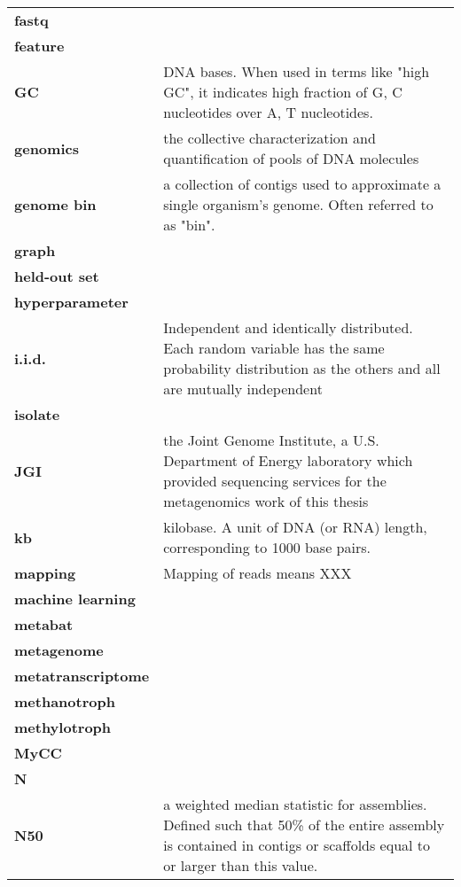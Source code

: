 \begin{singlespace}
\begin{longtable}{ p{}  p{} }
\textbf{fastq} &  \\
\textbf{feature} &  \\
\textbf{GC} & DNA bases.  When used in terms like "high GC", it indicates high fraction of G, C nucleotides over A, T nucleotides. \\
\textbf{genomics} & the collective characterization and quantification of pools of DNA molecules \\
\textbf{genome bin} & a collection of contigs used to approximate a single organism's genome.  Often referred to as "bin". \\
\textbf{graph} &  \\
\textbf{held-out set} &  \\
\textbf{hyperparameter} &  \\
\textbf{i.i.d.} & Independent and identically distributed.
    Each random variable has the same probability distribution as the others and all are mutually independent \\
\textbf{isolate} & \\
\textbf{JGI} & the Joint Genome Institute, a U.S. Department of Energy laboratory which provided sequencing
                services for the metagenomics work of this thesis \\
\textbf{kb} & kilobase. A unit of DNA (or RNA) length, corresponding to 1000 base pairs. \\
\textbf{mapping} & Mapping of reads means XXX \\
\textbf{machine learning} &  \\
\textbf{metabat} &  \\
\textbf{metagenome} &  \\
\textbf{metatranscriptome} &  \\
\textbf{methanotroph} &  \\
\textbf{methylotroph} &  \\
\textbf{MyCC} &  \\
\textbf{N} &  \\
\textbf{N50} & a weighted median statistic for assemblies.  %
    Defined such that 50\% of the entire assembly is contained in contigs or scaffolds equal to or larger than this value. \\

\end{longtable}
\end{singlespace}
